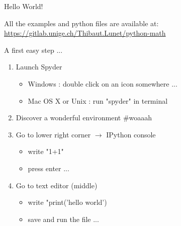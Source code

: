 \documentclass[11pt,unknownkeysallowed,usenames,dvipsnames]{beamer}
\begin{document}
        \begin{frame}{Hello World!}
            \begin{center}
                All the examples and python files are available at: \\
                \href{https://gitlab.unige.ch/Thibaut.Lunet/python-math}{https://gitlab.unige.ch/Thibaut.Lunet/python-math}
            \end{center}
            
            \begin{block}{A first easy step ...}
                \begin{enumerate}
                    \item Launch Spyder
                    \begin{itemize}
                        \item Windows : double click on an icon somewhere ...
                        \item Mac OS X or Unix : run "spyder" in terminal
                    \end{itemize}
                    \item Discover a wonderful environment \#woaaah
                    \item Go to lower right corner $\rightarrow$ IPython console
                    \begin{itemize}
                        \item write "1+1"
                        \item press enter ...
                    \end{itemize}
                    \item Go to text editor (middle)
                    \begin{itemize}
                        \item write "print('hello world')
                        \item save and run the file ...
                    \end{itemize}
                \end{enumerate}
            \end{block}
            
        \end{frame}
\end{document}
